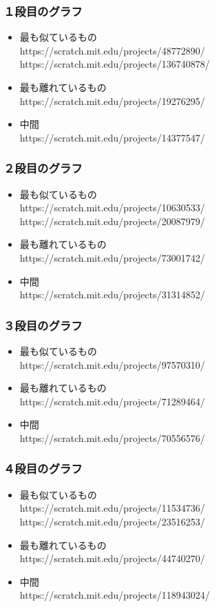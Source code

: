 \documentclass[a4paper,10pt,onecolumn,oneside,openany]{jsbook}
\begin{document}
\subsubsection{１段目のグラフ}
\begin{itemize}
\item 最も似ているもの
\\https://scratch.mit.edu/projects/48772890/
\\https://scratch.mit.edu/projects/136740878/
\item 最も離れているもの
\\https://scratch.mit.edu/projects/19276295/
\item 中間
\\https://scratch.mit.edu/projects/14377547/
\end{itemize}

\subsubsection{２段目のグラフ}
\begin{itemize}
\item 最も似ているもの
\\https://scratch.mit.edu/projects/10630533/
\\https://scratch.mit.edu/projects/20087979/
\item 最も離れているもの
\\https://scratch.mit.edu/projects/73001742/
\item 中間
\\https://scratch.mit.edu/projects/31314852/
\end{itemize}

 \subsubsection{３段目のグラフ}
 \begin{itemize}
\item 最も似ているもの
\\https://scratch.mit.edu/projects/97570310/
\item 最も離れているもの
\\https://scratch.mit.edu/projects/71289464/
\item 中間
\\https://scratch.mit.edu/projects/70556576/
\end{itemize}

\subsubsection{４段目のグラフ}
\begin{itemize}
\item 最も似ているもの
\\https://scratch.mit.edu/projects/11534736/
\\https://scratch.mit.edu/projects/23516253/
\item 最も離れているもの
\\https://scratch.mit.edu/projects/44740270/
\item 中間
\\https://scratch.mit.edu/projects/118943024/
\end{itemize}
\end{document}
